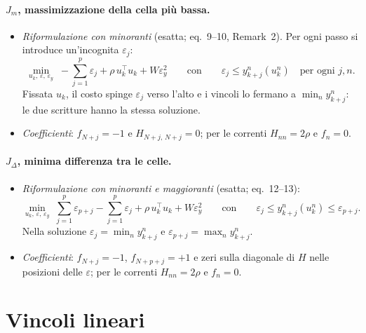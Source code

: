 \documentclass[11pt,a4paper]{article}
\begin{document}
\paragraph{$J_m$, massimizzazione della cella più bassa.}
\begin{itemize}
  \item \emph{Riformulazione con minoranti} (esatta; eq.~9--10, Remark~2).
        Per ogni passo si introduce un'incognita $\varepsilon_j$:
        \[
          \min_{u_k,\,\varepsilon,\,\varepsilon_y} \; -\sum_{j=1}^{p} \varepsilon_j
             + \rho\, u_k^\top u_k + W \varepsilon_y^2
          \qquad \text{con} \qquad
          \varepsilon_j \le y^n_{k+j}(u^n_k) \quad \text{per ogni } j, n .
        \]
        Fissata $u_k$, il costo spinge $\varepsilon_j$ verso l'alto e i
        vincoli lo fermano a $\min_n y^n_{k+j}$: le due scritture hanno la
        stessa soluzione.
  \item \emph{Coefficienti}: $f_{N+j} = -1$ e $H_{N+j,\,N+j} = 0$; per le
        correnti $H_{nn} = 2\rho$ e $f_n = 0$.
\end{itemize}

\paragraph{$J_\Delta$, minima differenza tra le celle.}
\begin{itemize}
  \item \emph{Riformulazione con minoranti e maggioranti} (esatta;
        eq.~12--13):
        \[
          \min_{u_k,\,\varepsilon,\,\varepsilon_y} \; \sum_{j=1}^{p} \varepsilon_{p+j}
             - \sum_{j=1}^{p} \varepsilon_j + \rho\, u_k^\top u_k + W \varepsilon_y^2
          \qquad \text{con} \qquad
          \varepsilon_j \le y^n_{k+j}(u^n_k) \le \varepsilon_{p+j} .
        \]
        Nella soluzione $\varepsilon_j = \min_n y^n_{k+j}$ e
        $\varepsilon_{p+j} = \max_n y^n_{k+j}$.
  \item \emph{Coefficienti}: $f_{N+j} = -1$, $f_{N+p+j} = +1$ e zeri sulla
        diagonale di $H$ nelle posizioni delle $\varepsilon$; per le correnti
        $H_{nn} = 2\rho$ e $f_n = 0$.
\end{itemize}

\section{Vincoli lineari}\label{sec:vincoli}
\end{document}
